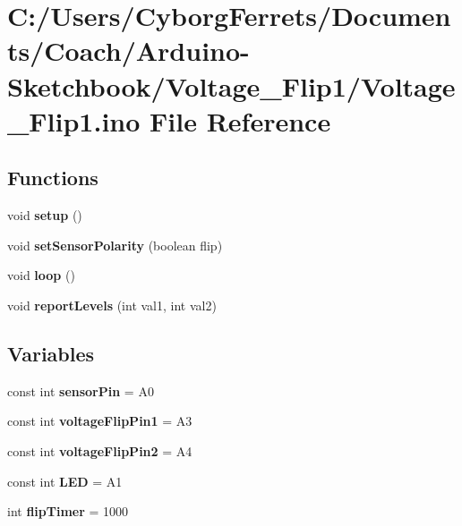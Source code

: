 \hypertarget{_voltage___flip1_8ino}{}\section{C\+:/\+Users/\+Cyborg\+Ferrets/\+Documents/\+Coach/\+Arduino-\/\+Sketchbook/\+Voltage\+\_\+\+Flip1/\+Voltage\+\_\+\+Flip1.ino File Reference}
\label{_voltage___flip1_8ino}
\subsection*{Functions}
\begin{DoxyCompactItemize}
\item 
\mbox{\label{_voltage___flip1_8ino_a4fc01d736fe50cf5b977f755b675f11d}} 
void {\bfseries setup} ()
\item 
\mbox{\label{_voltage___flip1_8ino_a5df887dda0edbc1fe97d9d7d9250cdab}} 
void {\bfseries set\+Sensor\+Polarity} (boolean flip)
\item 
\mbox{\label{_voltage___flip1_8ino_afe461d27b9c48d5921c00d521181f12f}} 
void {\bfseries loop} ()
\item 
\mbox{\label{_voltage___flip1_8ino_a1968304e8363279cd8e29cdcbc184349}} 
void {\bfseries report\+Levels} (int val1, int val2)
\end{DoxyCompactItemize}
\subsection*{Variables}
\begin{DoxyCompactItemize}
\item 
\mbox{\label{_voltage___flip1_8ino_a1073356e0e1a07d0cf84ec154a2060ec}} 
const int {\bfseries sensor\+Pin} = A0
\item 
\mbox{\label{_voltage___flip1_8ino_afeb01fe8e64f41e1c6ad3777c2a3aa6c}} 
const int {\bfseries voltage\+Flip\+Pin1} = A3
\item 
\mbox{\label{_voltage___flip1_8ino_a9704d98e8240e2efb178a310a237afe1}} 
const int {\bfseries voltage\+Flip\+Pin2} = A4
\item 
\mbox{\label{_voltage___flip1_8ino_a734029c5fc6508cd75bf19cd7f52b66d}} 
const int {\bfseries L\+ED} = A1
\item 
\mbox{\label{_voltage___flip1_8ino_aee78dc7dae91ec43886fc97cacb4b493}} 
int {\bfseries flip\+Timer} = 1000
\end{DoxyCompactItemize}
